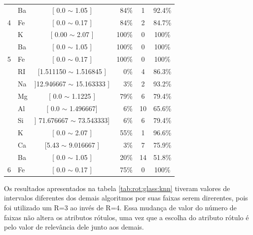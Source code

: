 \begin{table}[!h]
{\begin{tabular}{llcrcc}
                                            & Ba     & [ 0.0 $\sim$  1.05 ]    & 84\%  & 1  & 92.4\% \\  
\multirow{-5}{*}{4}                          & Fe    & [ 0.0 $\sim$  0.17 ]    & 84\%  & 2  & 84.7\% \\  \hline                                            
                                            & K     & [ 0.00 $\sim$  2.07 ]     & 100\%  & 0 & 100\% \\ 
                                            & Ba     & [ 0.0 $\sim$  1.05 ]    & 100\%  & 0 & 100\% \\  
\multirow{-3}{*}{5}                         & Fe    & [ 0.0 $\sim$  0.17 ]     & 100\%  & 0 & 100\% \\  \hline
                                            & RI     & [1.511150 $\sim$  1.516845 ] & 0\%  & 4  & 86.3\% \\ 
                                            & Na     & ]12.946667 $\sim$  15.163333 ] & 3\%  & 2  & 93.2\% \\ 
                                             & Mg    & [ 0.0 $\sim$  1.1225 ]    & 79\%  &6  & 79.4\%\\ 
                                             & Al    & [ 0.0 $\sim$  1.496667]      & 6\%  & 10  & 65.6\%\\
                                            & Si    & ] 71.676667 $\sim$  73.543333]      & 6\%  & 6  & 79.4\%\\
                                            & K     & [  0.0 $\sim$  2.07 ]    & 55\%  & 1  & 96.6\% \\ 
                                            & Ca     & [5.43 $\sim$ 9.016667 ]    & 3\%  & 7  & 75.9\% \\ 
                                            & Ba     & [ 0.0 $\sim$ 1.05 ]    & 20\%  & 14  & 51.8\% \\ 
\multirow{-9}{*}{6}                         & Fe    & [ 0.0 $\sim$  0.17 ]     & 75\%  & 0  & 100\% \\  \hline\hline

\end{tabular}
}
\end{table}



Os resultados apresentados na tabela \ref{tab:rot:glass:knn} tiveram valores de intervalos diferentes dos demais algoritmos por suas faixas serem direrentes, pois foi utilizado um R=3 ao invés de R=4. Essa mudança de valor do número de faixas não altera os atributos rótulos, uma vez que a escolha do atributo rótulo é pelo valor de relevância dele junto aos demais.

